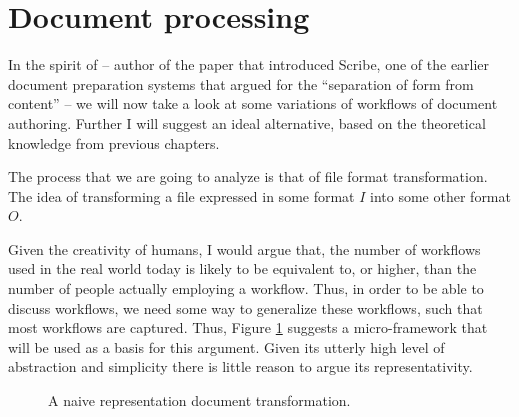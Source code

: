 \documentclass{scrreprt}
\begin{document}
\color{black}










\section{Document processing}
\label{sec:theory-of-document-processing}

\label{sec:microframework}
In the spirit of \citet{reid} -- author of the paper that introduced Scribe, one of the earlier document preparation systems that argued for the ``separation of form from content'' -- we will now take a look at some variations of workflows of document authoring. Further I will suggest an ideal alternative, based on the theoretical knowledge from previous chapters.

The process that we are going to analyze is that of file format transformation. The idea of transforming a file expressed in some format $I$ into some other format $O$.

Given the creativity of humans, I would argue that, the number of workflows used in the real world today is likely to be equivalent to, or higher, than the number of people actually employing a workflow. Thus, in order to be able to discuss workflows, we need some way to generalize these workflows, such that most workflows are captured. Thus, Figure \ref{fig:workflows-framework} suggests a micro-framework that will be used as a basis for this argument. Given its utterly high level of abstraction and simplicity there is little reason to argue its representativity.


\begin{figure}[h]
  \centering


  \caption{A naive representation document transformation.}
  \label{fig:workflows-framework}
\end{figure}
\end{document}
